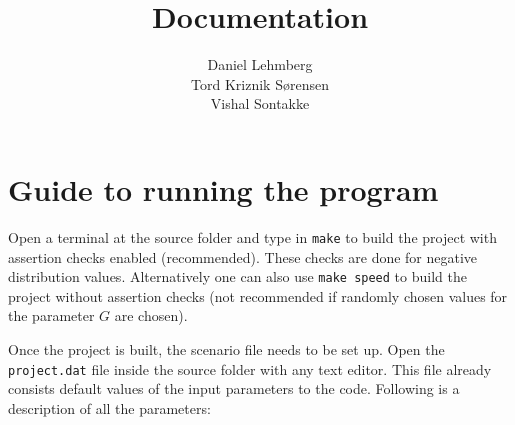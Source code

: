 \documentclass[11pt]{article}
\title{\textbf{Documentation}}
\author{Daniel Lehmberg\\
		Tord Kriznik Sørensen\\
		Vishal Sontakke}
\date{}
\begin{document}
\maketitle

\section{Guide to running the program}
Open a terminal at the source folder and type in \verb|make| to build the project with assertion checks enabled (recommended). These checks are done for negative distribution values. Alternatively one can also use \verb|make speed| to build the project without assertion checks (not recommended if randomly chosen values for the parameter $G$ are chosen).

Once the project is built, the scenario file needs to be set up. Open the \verb|project.dat| file inside the source folder with any text editor. This file already consists default values of the input parameters to the code. Following is a description of all the parameters:
\end{document}
